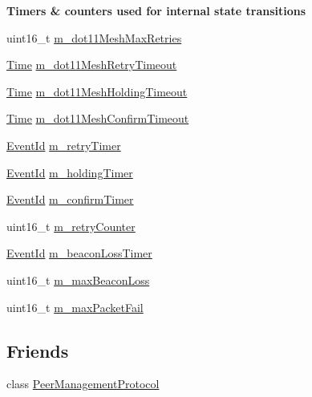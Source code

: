 \begin{Indent}{\bf Timers \& counters used for internal state transitions}\par
\begin{DoxyCompactItemize}
\item 
uint16\+\_\+t \hyperlink{classns3_1_1dot11s_1_1PeerLink_adaba064ea7db59400f431a81fc14e625}{m\+\_\+dot11\+Mesh\+Max\+Retries}
\item 
\hyperlink{classns3_1_1Time}{Time} \hyperlink{classns3_1_1dot11s_1_1PeerLink_a22301ed1ad769d20d70933f374e49274}{m\+\_\+dot11\+Mesh\+Retry\+Timeout}
\item 
\hyperlink{classns3_1_1Time}{Time} \hyperlink{classns3_1_1dot11s_1_1PeerLink_af3f06e1ce00ae15507c365d4e03a6df8}{m\+\_\+dot11\+Mesh\+Holding\+Timeout}
\item 
\hyperlink{classns3_1_1Time}{Time} \hyperlink{classns3_1_1dot11s_1_1PeerLink_a4e4f4133653048dfd043cc88bb3bf52c}{m\+\_\+dot11\+Mesh\+Confirm\+Timeout}
\item 
\hyperlink{classns3_1_1EventId}{Event\+Id} \hyperlink{classns3_1_1dot11s_1_1PeerLink_a8c07f1850cc7c0cd2077ce904f376dfb}{m\+\_\+retry\+Timer}
\item 
\hyperlink{classns3_1_1EventId}{Event\+Id} \hyperlink{classns3_1_1dot11s_1_1PeerLink_a89ff9284cc7ecd88ad31c94b61f4723c}{m\+\_\+holding\+Timer}
\item 
\hyperlink{classns3_1_1EventId}{Event\+Id} \hyperlink{classns3_1_1dot11s_1_1PeerLink_afafae6769dc62ce78485bca6d4cc4531}{m\+\_\+confirm\+Timer}
\item 
uint16\+\_\+t \hyperlink{classns3_1_1dot11s_1_1PeerLink_ad6aab8d83a3e212856351ace28b668c1}{m\+\_\+retry\+Counter}
\item 
\hyperlink{classns3_1_1EventId}{Event\+Id} \hyperlink{classns3_1_1dot11s_1_1PeerLink_acddf9e4b543d5219c384570db38eb17f}{m\+\_\+beacon\+Loss\+Timer}
\item 
uint16\+\_\+t \hyperlink{classns3_1_1dot11s_1_1PeerLink_a607929cb8d1aaeae2f76a35d6ca35519}{m\+\_\+max\+Beacon\+Loss}
\item 
uint16\+\_\+t \hyperlink{classns3_1_1dot11s_1_1PeerLink_a64a16ee3887745ac82cb8f10c1d94c7e}{m\+\_\+max\+Packet\+Fail}
\end{DoxyCompactItemize}
\end{Indent}
\subsection*{Friends}
\begin{DoxyCompactItemize}
\item 
class \hyperlink{classns3_1_1dot11s_1_1PeerLink_aad3da9b62656f5a6e24156893dc4e239}{Peer\+Management\+Protocol}
\end{DoxyCompactItemize}
